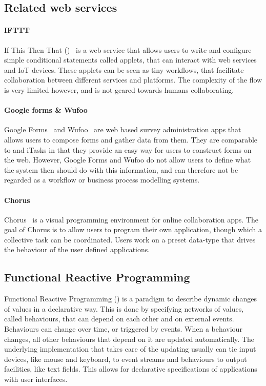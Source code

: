 \subsection{Related web services}


\paragraph{IFTTT}

If This Then That (\IFTTT)~\cite{IFTTT} is a web service that allows users to write and
configure simple conditional statements called applets, that can interact with
web services and IoT devices. These applets can be seen as tiny workflows, that
facilitate collaboration between different services and platforms. The
complexity of the flow is very limited however, and is not geared towards humans
collaborating.

\paragraph{Google forms \& Wufoo}

Google Forms~\cite{googleforms} and Wufoo~\cite{wufoo} are web based survey administration apps that allows
users to compose forms and gather data from them. They are comparable to \TOP and
iTasks in that they provide an easy way for users to construct forms on the web.
However, Google Forms and Wufoo do not allow users to define what the system
then should do with this information, and can therefore not be regarded as a
workflow or business process modelling systems.

\paragraph{Chorus} %

Chorus~\cite{chen2017chorus} is a visual programming environment for online
collaboration apps. The goal of Chorus is to allow users to program their own
application, though which a collective task can be coordinated. Users work on a
preset data-type that drives the behaviour of the user defined applications.


\subsection{Functional Reactive Programming}

Functional Reactive Programming (\FRP) is a paradigm to describe dynamic changes of values in a declarative way.
This is done by specifying networks of values, called behaviours, that can depend on each other and on external events.
Behaviours can change over time, or triggered by events.
When a behaviour changes, all other behaviours that depend on it are updated automatically.
The underlying implementation that takes care of the updating usually can tie input devices, like mouse and keyboard, to event streams and behaviours to output facilities, like text fields.
This allows for declarative specifications of applications with user interfaces.

